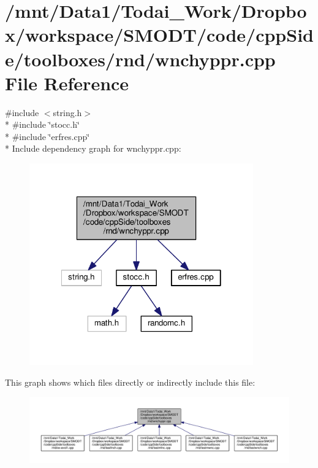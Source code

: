 \section{/mnt/\-Data1/\-Todai\-\_\-\-Work/\-Dropbox/workspace/\-S\-M\-O\-D\-T/code/cpp\-Side/toolboxes/rnd/wnchyppr.cpp File Reference}
\label{toolboxes_2rnd_2wnchyppr_8cpp}
{\ttfamily \#include $<$string.\-h$>$}\\*
{\ttfamily \#include \char`\"{}stocc.\-h\char`\"{}}\\*
{\ttfamily \#include \char`\"{}erfres.\-cpp\char`\"{}}\\*
Include dependency graph for wnchyppr.\-cpp\-:\nopagebreak
\begin{figure}[H]
\begin{center}
\leavevmode
\includegraphics[width=274pt]{toolboxes_2rnd_2wnchyppr_8cpp__incl}
\end{center}
\end{figure}
This graph shows which files directly or indirectly include this file\-:\nopagebreak
\begin{figure}[H]
\begin{center}
\leavevmode
\includegraphics[width=350pt]{toolboxes_2rnd_2wnchyppr_8cpp__dep__incl}
\end{center}
\end{figure}
